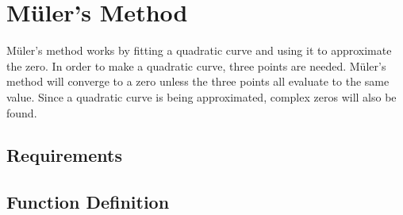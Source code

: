 \section{M\"{u}ler's Method}
M\"{u}ler's method works by fitting a quadratic curve and using it to approximate the zero.  In order to make a quadratic curve, three points are needed.  M\"{u}ler's method will converge to a zero unless the three points all evaluate to the same value.  Since a quadratic curve is being approximated, complex zeros will also be found.
\subsection{Requirements}
\subsection{Function Definition}
